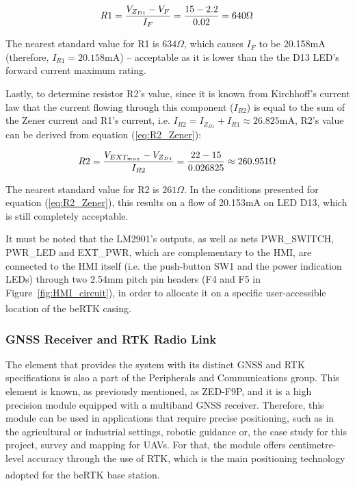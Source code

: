 \begin{equation}\label{eq:R1_Zener}
	R1=\frac{V_{Z_{D1}} - V_F}{I_F}=\frac{15 - 2.2}{0.02}=640\Omega \,\medskip
\end{equation}

The nearest standard value for R1 is $634 \Omega$, which causes $I_F$ to be 20.158mA (therefore, $I_{R1}=20.158$mA) -- acceptable as it is lower than the the D13 LED's forward current maximum rating.

Lastly, to determine resistor R2's value, since it is known from Kirchhoff's current law that the current flowing through this component ($I_{R2}$) is equal to the sum of the Zener current and R1's current, i.e. $I_{R2}=I_{Z_{D1}}+I_{R1} \approx 26.825$mA, R2's value can be derived from equation (\ref{eq:R2_Zener}):

\begin{equation}\label{eq:R2_Zener}
	R2 = \frac{V_{EXT_{max}} - V_{Z_{D1}}}{I_{R2}} = \frac{22 - 15}{0.026825} \approx 260.951 \Omega \,\medskip
\end{equation}

The nearest standard value for R2 is $261 \Omega$. In the conditions presented for equation (\ref{eq:R2_Zener}), this results on a flow of 20.153mA on LED D13, which is still completely acceptable.

It must be noted that the LM2901's outputs, as well as nets PWR\_SWITCH, PWR\_LED and EXT\_PWR, which are complementary to the HMI, are connected to the HMI itself (i.e. the push-button SW1 and the power indication LEDs) through two 2.54mm pitch pin headers (F4 and F5 in Figure~\ref{fig:HMI_circuit}), in order to allocate it on a specific user-accessible location of the beRTK\textsuperscript{\textregistered} casing.


\subsubsection{GNSS Receiver and RTK Radio Link}\label{sec:3232_ZEDF9P}

The element that provides the system with its distinct GNSS and RTK specifications is also a part of the Peripherals and Communications group. This element is known, as previously mentioned, as ZED-F9P, and it is a high precision module equipped with a multiband GNSS receiver. Therefore, this module can be used in applications that require precise positioning, such as in the agricultural or industrial settings, robotic guidance or, the case study for this project, survey and mapping for UAVs. For that, the module offers centimetre-level accuracy through the use of RTK, which is the main positioning technology adopted for the beRTK\textsuperscript{\textregistered} base station.

